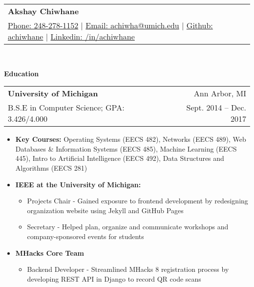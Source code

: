 \documentclass[letterpaper,11pt]{article}
\makeatletter
\newcommand{\resitem}[1]{\item #1 \vspace{-2pt}}
\newcommand{\resheading}[1]{{\large \colorbox{mygrey}{\begin{minipage}{\textwidth}{\textbf{#1 \vphantom{p\^{E}}}}\end{minipage}}}}
\newcommand{\ressubheading}[4]{
\begin{tabular*}{6.875in}{l@{\extracolsep{\fill}}r}
		\textbf{#1} & #2 \\
		#3 & #4 \\
\end{tabular*}\vspace{-6pt}}
\renewcommand{\footnotesize}{\fontsize{10pt}{11pt}\selectfont}
\makeatother
\begin{document}
\newcommand{\mywebheader}{
	\begin{tabular*}{7in}{l@{\extracolsep{\fill}}r}
		\textbf{{\LARGE Akshay Chiwhane}} \\
			\href{tel:248-278-1152}{Phone: 248-278-1152} |
			\href{mailto:achiwha@umich.edu}{Email: achiwha@umich.edu} |
			\href{https://github.com/achiwhane}{Github: achiwhane} |
			\href{https://linkedin.com/in/achiwhane}{Linkedin: /in/achiwhane}	\end{tabular*}
		\\
		\vspace{0.1in}}
		
		\mywebheader
		
		\resheading{Education}
		\begin{description}
			\item
			\ressubheading{{University of Michigan}}{Ann Arbor, MI}{B.S.E in Computer Science; GPA: 3.426/4.000}{Sept. 2014 -- Dec. 2017}
			{ \footnotesize
				\begin{itemize}
					\resitem{\textbf{Key Courses:}
						Operating Systems (EECS 482), 
						Networks (EECS 489),
						Web Databases \& Information Systems (EECS 485),
						Machine Learning (EECS 445),
						Intro to Artificial Intelligence (EECS 492),
						Data Structures and Algorithms (EECS 281)
					}
					\resitem{\textbf{IEEE at the University of Michigan:}} 
					\begin{itemize}
						\resitem{Projects Chair - Gained exposure to frontend development by redesigning organization website using Jekyll and GitHub Pages}
						\resitem{Secretary - Helped plan, organize and communicate workshops and company-sponsored events for students} 
					\end{itemize}
					\resitem{\textbf{MHacks Core Team}} 
					\begin{itemize}
						\resitem{Backend Developer - Streamlined MHacks 8 registration process by developing REST API in Django to record QR code scans}
					\end{itemize}
				\end{itemize}
			}
		\end{description} %
		
\end{document}
